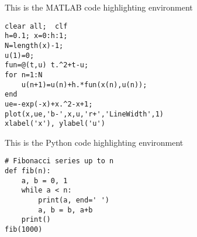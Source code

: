 \documentclass[11pt]{article}
\begin{document}
\medskip
\noindent This is the MATLAB code highlighting environment

\begin{lstlisting}[style=Matlab,basicstyle=\footnotesize\fontspec{Courier New},title={MATLAB code}]
% Euler method for the ODEs
clear all;  clf
h=0.1; x=0:h:1;
N=length(x)-1;
u(1)=0;
fun=@(t,u) t.^2+t-u;
for n=1:N
    u(n+1)=u(n)+h.*fun(x(n),u(n));
end
ue=-exp(-x)+x.^2-x+1;
plot(x,ue,'b-',x,u,'r+','LineWidth',1)
xlabel('x'), ylabel('u')
\end{lstlisting}

\medskip
\noindent This is the Python code highlighting environment

\begin{lstlisting}[style=python,basicstyle=\footnotesize\fontspec{Consolas},title={Python code}]
# Fibonacci series up to n
def fib(n):
    a, b = 0, 1
    while a < n:
        print(a, end=' ')
        a, b = b, a+b
    print()
fib(1000)
\end{lstlisting}
\end{document}
